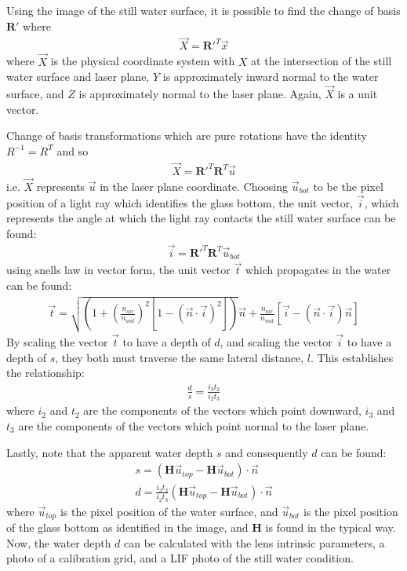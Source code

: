 Using the image of the still water surface, it is possible to find the change of basis $\boldsymbol{R'}$ where
\begin{gather*}
	\vec{X} = \boldsymbol{R'}^T \vec{x}
\end{gather*}
where $\vec{X}$ is the physical coordinate system with $X$ at the intersection of the still water surface and laser plane, $Y$ is approximately inward normal to the water surface, and $Z$ is approximately normal to the laser plane.
Again, $\vec{X}$ is a unit vector.
\par
Change of basis transformations which are pure rotations have the identity $R^{-1} = R^T$ and so
\begin{gather*}
	\vec{X} = \boldsymbol{R'}^T \boldsymbol{R}^T \vec{u}
\end{gather*}
i.e. $\vec{X}$ represents $\vec{u}$ in the laser plane coordinate.
Choosing  $\vec{u}_{bot}$ to be the pixel position of a light ray which identifies the glass bottom, the unit vector, $\vec{i}$, which represents the angle at which the light ray contacts the still water surface can be found:
\begin{gather*}
	\vec{i} = \boldsymbol{R'}^T \boldsymbol{R}^T \vec{u}_{bot}
\end{gather*}
using snells law in vector form, the unit vector $\vec{t}$ which propagates in the water can be found:
\begin{gather*}
	\vec{t} = \sqrt{\left( 1 + \left( \frac{n_{air}}{n_{wat}} \right)^2 \left[ 1 - \left(  \vec{n} \cdot \vec{i} \right)^2 \right] \right)} \vec{n} + \frac{n_{air}}{n_{wat}} \left[ \vec{i} - \left( \vec{n} \cdot \vec{i} \right) \vec{n} \right]
\end{gather*}
By scaling the vector $\vec{t}$ to have a depth of $d$, and scaling the vector $\vec{i}$ to have a depth of $s$, they both must traverse the same lateral distance, $l$.
This establishes the relationship:
\begin{gather*}
	\frac{d}{s} = \frac{i_3 t_2}{i_2 t_3}
\end{gather*}
where $i_2$ and $t_2$ are the components of the vectors which point downward, $i_3$ and $t_3$ are the components of the vectors which point normal to the laser plane.
\par
Lastly, note that the apparent water depth $s$ and consequently $d$ can be found:
\begin{gather*}
	s = \left( \boldsymbol{H} \vec{u}_{top} - \boldsymbol{H} \vec{u}_{bot} \right) \cdot \vec{n} \\
	d =\frac{i_3 t_2}{i_2 t_3}  \left( \boldsymbol{H} \vec{u}_{top} - \boldsymbol{H} \vec{u}_{bot} \right) \cdot \vec{n}
\end{gather*}
where $\vec{u}_{top}$ is the pixel position of the water surface, and $\vec{u}_{bot}$ is the pixel position of the glass bottom as identified in the image, and $\boldsymbol{H}$ is found in the typical way.
Now, the water depth $d$ can be calculated with the lens intrinsic parameters, a photo of a calibration grid, and a LIF photo of the still water condition.
%
